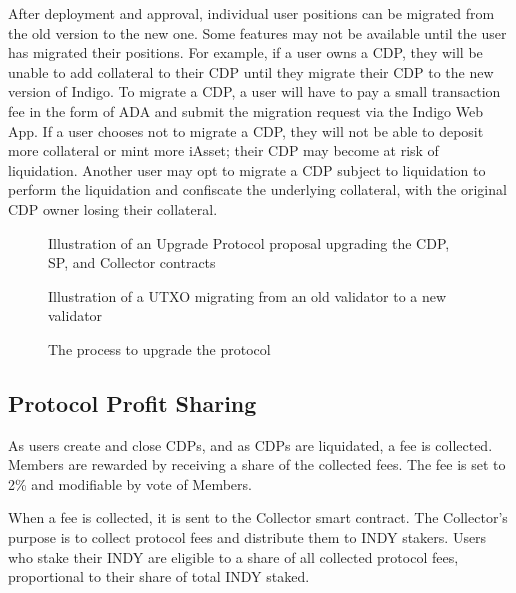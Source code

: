 \documentclass{article}
\begin{document}
\begin{sloppypar}
After deployment and approval, individual user positions can be migrated
from the old version to the new one. Some features may not be available
until the user has migrated their positions. For example, if a user owns
a CDP, they will be unable to add collateral to their CDP until they
migrate their CDP to the new version of Indigo. To migrate a CDP, a user
will have to pay a small transaction fee in the form of ADA and submit
the migration request via the Indigo Web App. If a user chooses not to
migrate a CDP, they will not be able to deposit more collateral or mint
more iAsset; their CDP may become at risk of liquidation. Another user
may opt to migrate a CDP subject to liquidation to perform the
liquidation and confiscate the underlying collateral, with the original
CDP owner losing their collateral.

\hypertarget{upgrade-protocol}{%
\begin{figure}[htbp]
\centering

\caption{Illustration of an Upgrade Protocol proposal upgrading the
CDP, SP, and Collector contracts}
\end{figure}}

\hypertarget{migrate-utxo}{%
\begin{figure}[htbp]
\centering

\caption{Illustration of a UTXO migrating from an old validator to a
new validator}
\end{figure}}

\hypertarget{upgrade-protocol-flowchart}{%
\begin{figure}[htbp]
\centering

\caption{The process to upgrade the protocol}
\end{figure}}

\hypertarget{protocol-profit-sharing}{%
\subsection{Protocol Profit Sharing}\label{protocol-profit-sharing}}

As users create and close CDPs, and as CDPs are liquidated, a fee is
collected. Members are rewarded by receiving a share of the collected
fees. The fee is set to 2\% and modifiable by vote of Members.

When a fee is collected, it is sent to the Collector smart contract. The
Collector's purpose is to collect protocol fees and distribute them to
INDY stakers. Users who stake their INDY are eligible to a share of all
collected protocol fees, proportional to their share of total INDY
staked.


\end{sloppypar}
\end{document}
